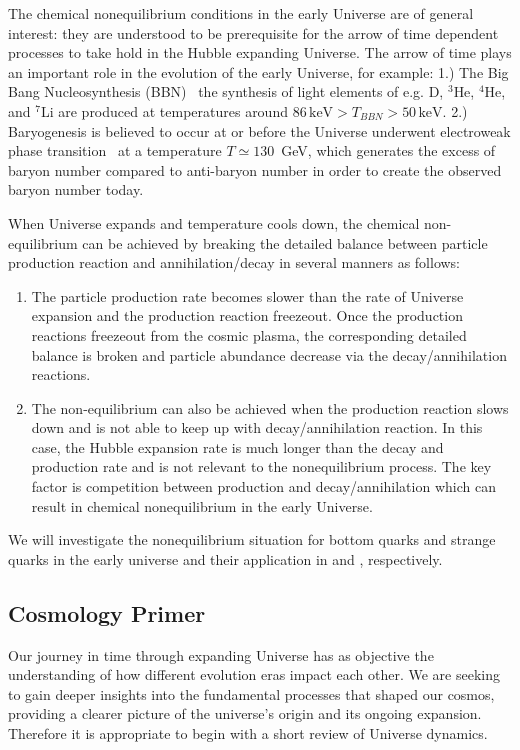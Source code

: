 The chemical nonequilibrium conditions in the early Universe are of general interest: they are understood to be prerequisite for the arrow of time dependent processes to take hold in the Hubble expanding Universe. The arrow of time plays an important role in the evolution of the early Universe, for example:
 1.) The Big Bang Nucleosynthesis (BBN)~\cite{Pitrou:2018cgg,Kolb:1990vq,Dodelson:2003ft,Mukhanov:2005sc}  the synthesis of light elements of  e.g. D, $^3$He, $^4$He, and $^7$Li are produced at temperatures around $86\,\mathrm{keV}>T_{BBN}>50\,\mathrm{keV}$. 
 2.) Baryogenesis is believed to occur at or before the Universe underwent electroweak phase transition~\cite{Kolb:1990vq} at a temperature $T\simeq 130$\, GeV, which generates the excess of baryon number compared to anti-baryon number in order to create the observed baryon number today.

When Universe expands and temperature cools down, the chemical non-equilibrium can be achieved by breaking the detailed balance between particle production reaction and annihilation/decay in several manners as follows:
\begin{enumerate}
\item The particle production rate becomes slower than the rate of Universe expansion and the production reaction freezeout. Once the production reactions freezeout from the cosmic plasma, the corresponding detailed balance is broken and particle abundance decrease via the decay/annihilation reactions.
%
\item The non-equilibrium can also be achieved when the production reaction slows down and is not able to keep up with decay/annihilation reaction. In this case, the Hubble expansion rate is much longer than the decay and production rate and is not relevant to the nonequilibrium process. The key factor is competition between production and decay/annihilation  which can result in chemical nonequilibrium in the early Universe.
\end{enumerate}
We will investigate the nonequilibrium situation for bottom quarks and strange quarks in the early universe and their application in   and , respectively.  


\subsection{Cosmology Primer}
\label{sec:flrw}
Our journey in time through expanding Universe has as objective the understanding of how different evolution eras impact each other. We are seeking to gain deeper insights into the fundamental processes that shaped our cosmos, providing a clearer picture of the universe's origin and its ongoing expansion. Therefore it is appropriate to begin with a short review of Universe dynamics.

